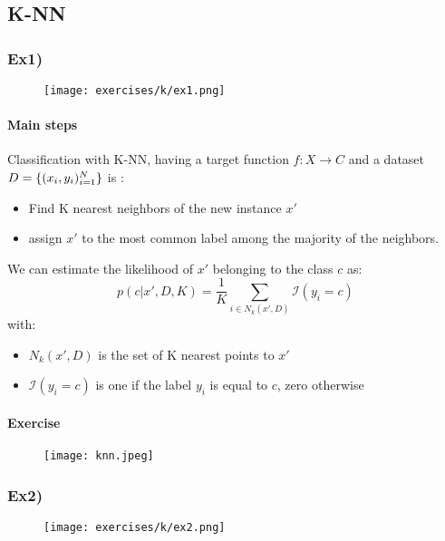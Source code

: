 \subsection{K-NN}

\subsubsection{Ex1)}

\begin{figure}[H]
    \centering
    \texttt{[image: exercises/k/ex1.png]}
\end{figure}

\paragraph{Main steps}
Classification with K-NN, having a target function $f:X\rightarrow C$ and a dataset $D=\lbrace{(x_i,y_i)^N_{i=1}}\rbrace$ is :
\begin{itemize}
\item Find K nearest neighbors of the new instance $x'$
\item assign $x'$ to the most common label among the majority of the neighbors.
\end{itemize}
We can estimate the likelihood of $x'$ belonging to the class $c$ as:
$$p(c| x',D,K)=\frac{1}{K}\sum_{i \in N_k(x',D)}\mathcal{I}(y_i=c)$$
with:
\begin{itemize}
\item $ N_k(x',D)$ is the set of K nearest points to $x'$
\item $\mathcal{I}(y_i=c)$ is one if the label $y_i$ is equal to $c$, zero otherwise
\end{itemize}


\paragraph{Exercise}
\begin{figure}[H]
    \centering
    \texttt{[image: knn.jpeg]}
\end{figure}




\subsubsection{Ex2)}
    \begin{figure}
       \centering

    \texttt{[image: exercises/k/ex2.png]}
\end{figure}

